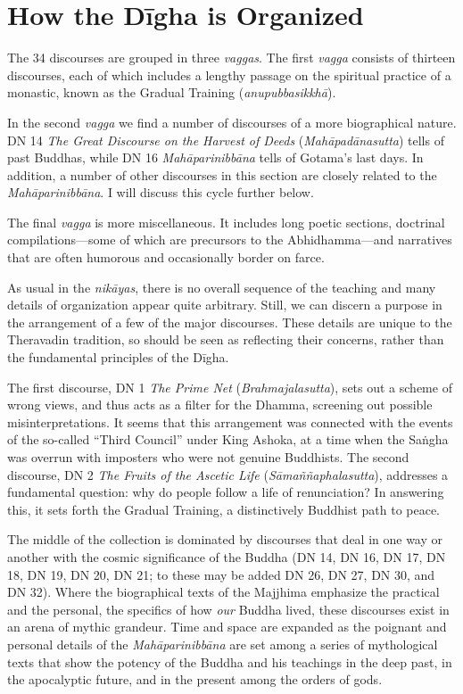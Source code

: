 \documentclass[12pt,openany]{book}%
\begin{document}
\section*{How the \textsanskrit{Dīgha} is Organized}

The 34 discourses are grouped in three \textit{vaggas}. The first \textit{vagga} consists of thirteen discourses, each of which includes a lengthy passage on the spiritual practice of a monastic, known as the Gradual Training (\textit{\textsanskrit{anupubbasikkhā}}).

In the second \textit{vagga} we find a number of discourses of a more biographical nature. DN 14 \textit{The Great Discourse on the Harvest of Deeds} (\textit{\textsanskrit{Mahāpadānasutta}}) tells of past Buddhas, while DN 16 \textit{\textsanskrit{Mahāparinibbāna}} tells of Gotama’s last days. In addition, a number of other discourses in this section are closely related to the \textit{\textsanskrit{Mahāparinibbāna}}. I will discuss this cycle further below.

The final \textit{vagga} is more miscellaneous. It includes long poetic sections, doctrinal compilations—some of which are precursors to the Abhidhamma—and narratives that are often humorous and occasionally border on farce.

As usual in the \textit{\textsanskrit{nikāyas}}, there is no overall sequence of the teaching and many details of organization appear quite arbitrary. Still, we can discern a purpose in the arrangement of a few of the major discourses. These details are unique to the Theravadin tradition, so should be seen as reflecting their concerns, rather than the fundamental principles of the \textsanskrit{Dīgha}.

The first discourse, DN 1 \textit{The Prime Net} (\textit{Brahmajalasutta}), sets out a scheme of wrong views, and thus acts as a filter for the Dhamma, screening out possible misinterpretations. It seems that this arrangement was connected with the events of the so-called “Third Council” under King Ashoka, at a time when the \textsanskrit{Saṅgha} was overrun with imposters who were not genuine Buddhists. The second discourse, DN 2 \textit{The Fruits of the Ascetic Life} (\textit{\textsanskrit{Sāmaññaphalasutta}}), addresses a fundamental question: why do people follow a life of renunciation? In answering this, it sets forth the Gradual Training, a distinctively Buddhist path to peace.

The middle of the collection is dominated by discourses that deal in one way or another with the cosmic significance of the Buddha (DN 14, DN 16, DN 17, DN 18, DN 19, DN 20, DN 21; to these may be added DN 26, DN 27, DN 30, and DN 32). Where the biographical texts of the Majjhima emphasize the practical and the personal, the specifics of how \emph{our} Buddha lived, these discourses exist in an arena of mythic grandeur. Time and space are expanded as the poignant and personal details of the \textit{\textsanskrit{Mahāparinibbāna}} are set among a series of mythological texts that show the potency of the Buddha and his teachings in the deep past, in the apocalyptic future, and in the present among the orders of gods.
\end{document}
